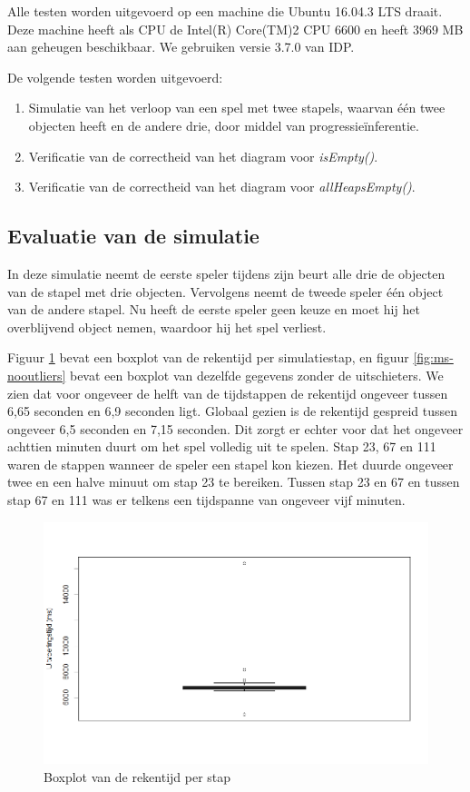 Alle testen worden uitgevoerd op een machine die Ubuntu 16.04.3 LTS draait. Deze machine heeft als CPU de Intel(R) Core(TM)2 CPU 6600 en heeft 3969 MB aan geheugen beschikbaar. We gebruiken versie 3.7.0 van IDP.

De volgende testen worden uitgevoerd:

\begin{enumerate}
	\item Simulatie van het verloop van een spel met twee stapels, waarvan \'e\'en twee objecten heeft en de andere drie, door middel van progressie\"inferentie.
	\item Verificatie van de correctheid van het diagram voor \textit{isEmpty()}.
	\item Verificatie van de correctheid van het diagram voor \textit{allHeapsEmpty()}. 
\end{enumerate}

\subsection{Evaluatie van de simulatie}

In deze simulatie neemt de eerste speler tijdens zijn beurt alle drie de objecten van de stapel met drie objecten. Vervolgens neemt de tweede speler \'e\'en object van de andere stapel. Nu heeft de eerste speler geen keuze en moet hij het overblijvend object nemen, waardoor hij het spel verliest.

Figuur \ref{fig:ms} bevat een boxplot van de rekentijd per simulatiestap, en figuur \ref{fig:ms-nooutliers} bevat een boxplot van dezelfde gegevens zonder de uitschieters. We zien dat voor ongeveer de helft van de tijdstappen de rekentijd ongeveer tussen 6,65 seconden en 6,9 seconden ligt. Globaal gezien is de rekentijd gespreid tussen ongeveer 6,5 seconden en 7,15 seconden. Dit zorgt er echter voor dat het ongeveer achttien minuten duurt om het spel volledig uit te spelen. Stap 23, 67 en 111 waren de stappen wanneer de speler een stapel kon kiezen. Het duurde ongeveer twee en een halve minuut om stap 23 te bereiken. Tussen stap 23 en 67 en tussen stap 67 en 111 was er telkens een tijdspanne van ongeveer vijf minuten.

\begin{figure}
	\includegraphics[width=1.05\textwidth]{chap-evaluatie/boxplot.png}
	\caption{Boxplot van de rekentijd per stap}
	\label{fig:ms}
\end{figure}

